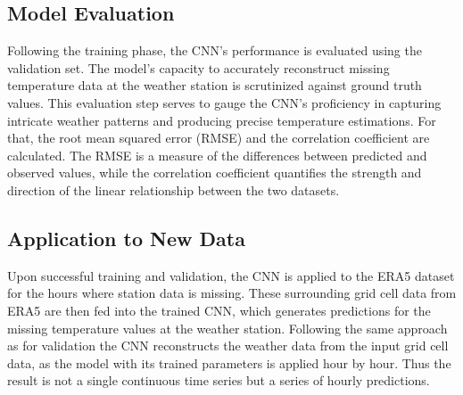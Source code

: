\subsection{Model Evaluation}
Following the training phase, the CNN's performance is evaluated using the validation set. The model's capacity to accurately reconstruct missing temperature data at the weather station is scrutinized against ground truth values. This evaluation step serves to gauge the CNN's proficiency in capturing intricate weather patterns and producing precise temperature estimations. For that, the root mean squared error (RMSE) and the correlation coefficient are calculated. The RMSE is a measure of the differences between predicted and observed values, while the correlation coefficient quantifies the strength and direction of the linear relationship between the two datasets.

\subsection{Application to New Data}
Upon successful training and validation, the CNN is applied to the ERA5 dataset for the hours where station data is missing. These surrounding grid cell data from ERA5 are then fed into the trained CNN, which generates predictions for the missing temperature values at the weather station. Following the same approach as for validation the CNN reconstructs the weather data from the input grid cell data, as the model with its trained parameters is applied hour by hour. Thus the result is not a single continuous time series but a series of hourly predictions.